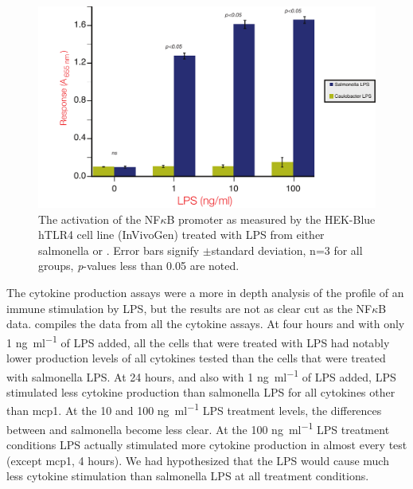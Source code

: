 \begin{figure}[htb]
  \begin{center}
    \includegraphics[width=\textwidth]{lps_chapter/img/NFkBAssay.pdf}
  \end{center}
  \caption[NF$\kappa$B Assay for cellular activation by \ac{LPS}]{
    The activation of the NF$\kappa$B promoter as measured by the HEK-Blue hTLR4\texttrademark{} cell line (InVivoGen) treated with \ac{LPS} from either \ac{salmonella} or \caulobacter{}. Error bars signify $\pm{}$standard deviation, n=3 for all groups, \textit{p}-values less than 0.05 are noted.  }
  \label{fig:nfkbassay}
\end{figure}    

The cytokine production assays were a more in depth analysis of the profile of an immune stimulation by \caulobacter{} \ac{LPS}, but the results are not as clear cut as the NF$\kappa$B data.  compiles the data from all the cytokine assays. At four hours and with only 1 \si{\nano\gram\per\milli\litre} of \ac{LPS} added, all the cells that were treated with \caulobacter{} \ac{LPS} had notably lower production levels of all cytokines tested than the cells that were treated with \ac{salmonella} \ac{LPS}. At 24 hours, and also with 1 \si{\nano\gram\per\milli\litre} of \ac{LPS} added, \caulobacter{} \ac{LPS} stimulated less cytokine production than \ac{salmonella} \ac{LPS} for all cytokines other than \ac{mcp1}. At the 10 and 100 \si{\nano\gram\per\milli\litre} \ac{LPS} treatment levels, the differences between \caulobacter{} and \ac{salmonella} become less clear. At the 100 \si{\nano\gram\per\milli\litre} \ac{LPS} treatment conditions \caulobacter{} \ac{LPS} actually stimulated more cytokine production in almost every test (except \ac{mcp1}, 4 hours). We had hypothesized that the \caulobacter{}  \ac{LPS} would cause much less cytokine stimulation than \ac{salmonella} \ac{LPS} at all treatment conditions. 

